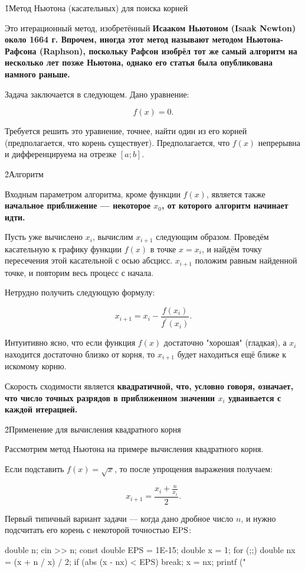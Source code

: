 \h1{Метод Ньютона (касательных) для поиска корней}

Это итерационный метод, изобретённый \bf{Исааком Ньютоном} (Isaak Newton) около 1664 г. Впрочем, иногда этот метод называют методом Ньютона-Рафсона (Raphson), поскольку Рафсон изобрёл тот же самый алгоритм на несколько лет позже Ньютона, однако его статья была опубликована намного раньше.

Задача заключается в следующем. Дано уравнение:

$$ f(x) = 0. $$

Требуется решить это уравнение, точнее, найти один из его корней (предполагается, что корень существует). Предполагается, что $f(x)$ непрерывна и дифференцируема на отрезке $[a;b]$.


\h2{Алгоритм}

Входным параметром алгоритма, кроме функции $f(x)$, является также \bf{начальное приближение} --- некоторое $x_0$, от которого алгоритм начинает идти.

Пусть уже вычислено $x_i$, вычислим $x_{i+1}$ следующим образом. Проведём касательную к графику функции $f(x)$ в точке $x = x_i$, и найдём точку пересечения этой касательной с осью абсцисс. $x_{i+1}$ положим равным найденной точке, и повторим весь процесс с начала.

Нетрудно получить следующую формулу:

$$ x_{i+1} = x_i - \frac{ f(x_i) }{ f^\prime(x_i) }. $$

Интуитивно ясно, что если функция $f(x)$ достаточно "хорошая" (гладкая), а $x_i$ находится достаточно близко от корня, то $x_{i+1}$ будет находиться ещё ближе к искомому корню.

Скорость сходимости является \bf{квадратичной}, что, условно говоря, означает, что число точных разрядов в приближенном значении $x_i$ удваивается с каждой итерацией.


\h2{Применение для вычисления квадратного корня}

Рассмотрим метод Ньютона на примере вычисления квадратного корня.

Если подставить $f(x) = \sqrt{x}$, то после упрощения выражения получаем:

$$ x_{i+1} = \frac{ x_i + \frac{n}{x_i} }{ 2 }. $$

Первый типичный вариант задачи --- когда дано дробное число $n$, и нужно подсчитать его корень с некоторой точностью $\rm EPS$:

\code
double n;
cin >> n;
const double EPS = 1E-15;
double x = 1;
for (;;) {
	double nx = (x + n / x) / 2;
	if (abs (x - nx) < EPS)  break;
	x = nx;
}
printf ("%
\endcode

